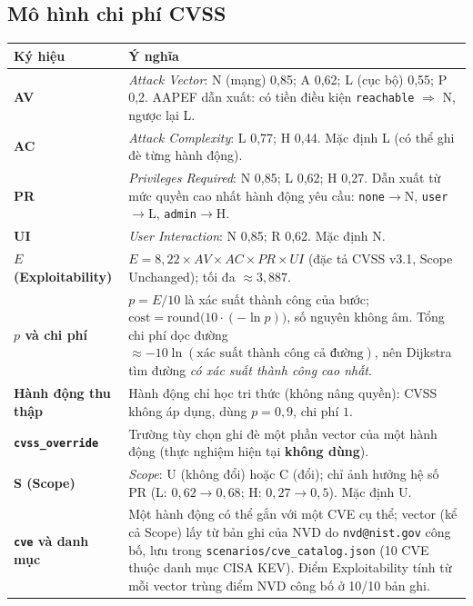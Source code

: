 \documentclass[11pt,a4paper]{article}
\begin{document}
\subsection{Mô hình chi phí CVSS}

\begin{longtable}{@{}Y{3.2cm}Y{12.6cm}@{}}
\toprule
Ký hiệu & Ý nghĩa \\
\midrule
\endhead
\textbf{AV} & \emph{Attack Vector}: N (mạng) 0,85; A 0,62; L (cục bộ) 0,55; P 0,2. AAPEF dẫn xuất: có tiền điều kiện \texttt{reachable} $\Rightarrow$ N, ngược lại L. \\
\textbf{AC} & \emph{Attack Complexity}: L 0,77; H 0,44. Mặc định L (có thể ghi đè từng hành động). \\
\textbf{PR} & \emph{Privileges Required}: N 0,85; L 0,62; H 0,27. Dẫn xuất từ mức quyền cao nhất hành động yêu cầu: \texttt{none}$\to$N, \texttt{user}$\to$L, \texttt{admin}$\to$H. \\
\textbf{UI} & \emph{User Interaction}: N 0,85; R 0,62. Mặc định N. \\
\textbf{$E$ (Exploitability)} & $E=8{,}22\times AV\times AC\times PR\times UI$ (đặc tả CVSS v3.1, Scope Unchanged); tối đa $\approx 3{,}887$. \\
\textbf{$p$ và chi phí} & $p=E/10$ là xác suất thành công của bước; $\text{cost}=\mathrm{round}\bigl(10\cdot(-\ln p)\bigr)$, số nguyên không âm. Tổng chi phí dọc đường $\approx -10\ln(\text{xác suất thành công cả đường})$, nên Dijkstra tìm đường \emph{có xác suất thành công cao nhất}. \\
\textbf{Hành động thu thập} & Hành động chỉ học tri thức (không nâng quyền): CVSS không áp dụng, dùng $p=0{,}9$, chi phí $1$. \\
\textbf{\texttt{cvss\_override}} & Trường tùy chọn ghi đè một phần vector của một hành động (thực nghiệm hiện tại \textbf{không dùng}). \\
\textbf{S (Scope)} & \emph{Scope}: U (không đổi) hoặc C (đổi); chỉ ảnh hưởng hệ số PR (L: $0{,}62\to0{,}68$; H: $0{,}27\to0{,}5$). Mặc định U. \\
\textbf{\texttt{cve} và danh mục} & Một hành động có thể gắn với một CVE cụ thể; vector (kể cả Scope) lấy từ bản ghi của NVD do \texttt{nvd@nist.gov} công bố, lưu trong \texttt{scenarios/cve\_catalog.json} (10 CVE thuộc danh mục CISA KEV). Điểm Exploitability tính từ mỗi vector trùng điểm NVD công bố ở 10/10 bản ghi. \\
\bottomrule
\end{longtable}
\end{document}
